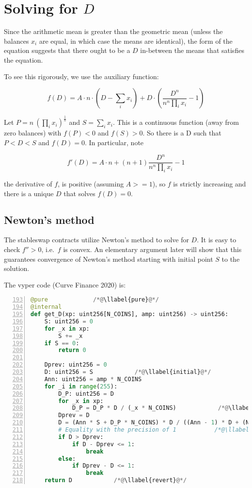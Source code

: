 \documentclass[
]{article}
\makeatletter
\newcounter{llabel}[lstlisting]%
\renewcommand*{\thellabel}{%
    \ifnum\value{llabel}<0 %
      \@ctrerr
    \else
      \ifnum\value{llabel}>10 %
        \@ctrerr
      \else
        \protect\footnotesize\ding{\the\numexpr\value{llabel}+201\relax}%
      \fi
    \fi
  }%
\newlength{\llabelsep}
\newcommand*{\llabel}[1]{%
  \begingroup
    \refstepcounter{llabel}%
    \label{#1}%
    \llap{%
      \thellabel\kern\llabelsep
      \hphantom{\lst@numberstyle\the\lst@lineno}%
      \kern\lst@numbersep
    }%
  \endgroup
}
\makeatother
\begin{document}
\hypertarget{solving-for-d}{%
\section{\texorpdfstring{Solving for
\(D\)}{Solving for D}}\label{solving-for-d}}

Since the arithmetic mean is greater than the geometric mean (unless the
balances \(x_i\) are equal, in which case the means are identical), the
form of the equation suggests that there ought to be a \(D\) in-between
the means that satisfies the equation.

To see this rigorously, we use the auxiliary function:

\[ f(D) = A \cdot n \cdot (D - \sum_i x_i)  + D \cdot (\frac{D^{n}}{n^n \prod_i x_i} - 1) \]

Let \(P = n\ (\prod_i x_i)^{\frac{1}{n}}\) and \(S = \sum_i x_i\). This
is a continuous function (away from zero balances) with \(f(P) < 0\) and
\(f(S) > 0\). So there is a D such that \(P < D < S\) and \(f(D) = 0\).
In particular, note

\[ f'(D) = A\cdot n + (n+1) \frac{D^n}{n^n \prod_i x_i} - 1 \]

the derivative of \(f\), is positive (assuming \(A >= 1\)), so \(f\) is
strictly increasing and there is a unique \(D\) that solves
\(f(D) = 0\).

\hypertarget{newtons-method}{%
\subsection{Newton's method}\label{newtons-method}}

The stableswap contracts utilize Newton's method to solve for \(D\). It
is easy to check \(f'' > 0\), i.e.~\(f\) is convex. An elementary
argument later will show that this guarantees convergence of Newton's
method starting with initial point \(S\) to the solution.

The vyper code (Curve Finance 2020) is:

\begin{lstlisting}[language=Python, numbers=left, firstnumber=193, caption={Calculation of D, the stableswap invariant}, label=get_D]
@pure             /*@\llabel{pure}@*/
@internal
def get_D(xp: uint256[N_COINS], amp: uint256) -> uint256:
    S: uint256 = 0 
    for _x in xp:
        S += _x
    if S == 0:
        return 0

    Dprev: uint256 = 0
    D: uint256 = S            /*@\llabel{initial}@*/
    Ann: uint256 = amp * N_COINS
    for _i in range(255):
        D_P: uint256 = D
        for _x in xp:
            D_P = D_P * D / (_x * N_COINS)            /*@\llabel{zero_division}@*/
        Dprev = D
        D = (Ann * S + D_P * N_COINS) * D / ((Ann - 1) * D + (N_COINS + 1) * D_P)            /*@\llabel{formula}@*/
        # Equality with the precision of 1           /*@\llabel{convergence}@*/
        if D > Dprev:
            if D - Dprev <= 1:
                break
        else:
            if Dprev - D <= 1:
                break
    return D            /*@\llabel{revert}@*/
\end{lstlisting}
\end{document}
